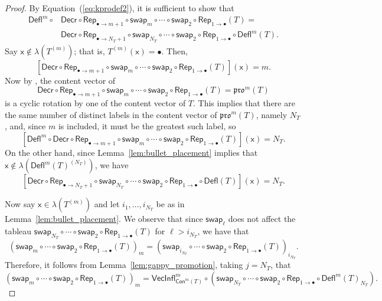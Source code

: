 \documentclass[12pt]{amsart}
\newcommand{\x}{\ensuremath{\mathsf{x}}}
\theoremstyle{definition}
\theoremstyle{remark}
\numberwithin{equation}{section}
\newcommand{\pro}{\mathfrak{pro}}
\newcommand{\swap}{\ensuremath{\mathsf{swap}}}
\newcommand{\decr}{\ensuremath{\mathsf{Decr}}}
\newcommand{\rep}{\ensuremath{\mathsf{Rep}}}
\newcommand{\deflate}{\ensuremath{\mathsf{Defl}}}
\newcommand{\inflate}{\ensuremath{\mathsf{VecInfl}}}
\newcommand{\content}{\ensuremath{\mathsf{Con}}}
\begin{document}
\begin{proof}
By Equation~(\ref{eq:kprodef2}), it is sufficient to show that
\begin{align*}
\deflate^m \circ &\decr \circ \rep_{\bullet \rightarrow m+1} \circ \swap_m \circ \cdots \circ \swap_2\circ \rep_{1 \rightarrow \bullet} (T) = \\
 & \decr \circ \rep_{\bullet \rightarrow N_T+1} \circ \swap_{N_T} \circ \cdots \circ \swap_2 \circ \rep_{1 \rightarrow \bullet} \circ \deflate^m (T). 
\end{align*}
Say $\x \not \in \lambda(T^{(m)})$; that is,  $T^{(m)}(\x) = \bullet$.  Then,
\[
[\decr \circ \rep_{\bullet \rightarrow m+1} \circ \swap_m \circ \cdots \circ \swap_2 \circ \rep_{1 \rightarrow \bullet} (T)](\x) = m.
\]
Now by \cite[Lemma~2.1]{DPS}, the content vector of  
\[
\decr \circ \rep_{\bullet \rightarrow m+1} \circ \swap_m \circ \cdots \circ \swap_2 \circ \rep_{1 \rightarrow \bullet} (T) = \pro^m(T)
\]
 is a cyclic rotation by one of the content vector of $T$. This implies that there are the same number of distinct labels in the content vector of $\pro^m(T)$, namely $N_T$, and, since $m$ is included, it must be the greatest such label, so 
 \[
 [\deflate^m \circ \decr \circ \rep_{\bullet \rightarrow m+1} \circ \swap_m \circ \cdots \circ \swap_2 \circ \rep_{1 \rightarrow \bullet} (T)](\x) = N_T.
 \]
  On the other hand, since Lemma~\ref{lem:bullet_placement} implies that $\x \not \in \lambda(\deflate^m(T)^{(N_T)})$, we have
  \[
  [\decr \circ \rep_{\bullet \rightarrow N_T + 1} \circ \swap_{N_T} \circ \cdots \circ \swap_2 \circ \rep_{1 \rightarrow \bullet} \circ \deflate(T)](\x) = N_T.
  \] 

Now say $\x \in \lambda(T^{(m)})$ and let $i_1, \ldots, i_{N_T}$ be as in Lemma~\ref{lem:bullet_placement}. We observe that since $\swap_\ell$ does not affect the tableau $\swap_{N_T} \circ \cdots \circ \swap_2 \circ \rep_{1 \rightarrow \bullet} (T)$ for $\ell > i_{N_T}$, we have that
\[ (\swap_m \circ \cdots \circ \swap_2 \circ \rep_{1 \rightarrow \bullet}( T ))_m = (\swap_{i_{N_T}} \circ \cdots \circ \swap_2 \circ \rep_{1 \rightarrow \bullet}( T ))_{i_{N_T}}.  \]
Therefore, it follows from Lemma~\ref{lem:gappy_promotion}, taking $j = N_T$, that 
\[ (\swap_m \circ \cdots \circ \swap_2 \circ \rep_{1 \rightarrow \bullet}( T ))_m = \inflate^m_{\content^m(T)} \circ (\swap_{N_T} \circ \cdots \circ   \swap_2  \circ \rep_{1 \rightarrow \bullet} \circ \deflate^m(T)_{N_T}). \]


\end{proof}
\end{document}
